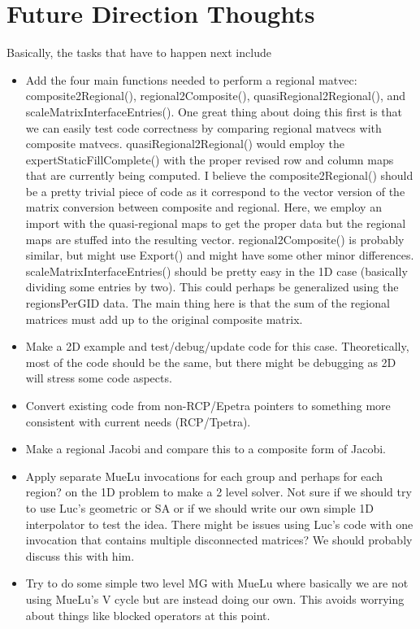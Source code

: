 \documentclass[11pt]{article}
\begin{document}
\section{Future Direction Thoughts}
Basically, the tasks that have to happen next include
\begin{itemize}
\item Add the four main functions needed to perform a regional matvec:
     {\sf composite2Regional()}, {\sf regional2Composite()}, {\sf quasiRegional2Regional()},
     and {\sf scaleMatrixInterfaceEntries()}. One great thing about doing this
     first is that we can easily test code correctness by comparing regional
     matvecs with composite matvecs. {\sf quasiRegional2Regional()} would
     employ the {\sf expertStaticFillComplete()} with the proper revised
     row and column maps that are currently being computed.  I believe the
     {\sf composite2Regional()} should be a pretty trivial piece of code
     as it correspond to the vector version of the matrix conversion
     between composite and regional. Here, we employ an import with
     the quasi-regional maps to get the proper data but the regional
     maps are stuffed into the resulting vector. {\sf regional2Composite()}
     is probably similar, but might use {\sf Export()}  and might have some
     other minor differences. {\sf scaleMatrixInterfaceEntries()} should
     be pretty easy in the 1D case (basically dividing some entries
     by two). This could perhaps be generalized using the {\sf regionsPerGID}
     data. The main thing here is that the sum of the regional matrices
     must add up to the original composite matrix.
\item Make a 2D example and test/debug/update code for this case. Theoretically,
      most of the code should be the same, but there might be debugging
      as 2D will stress some code aspects.
\item Convert existing code from non-RCP/Epetra pointers to something
      more consistent with current needs (RCP/Tpetra).
\item Make a regional Jacobi and compare this to a composite form of Jacobi.
\item Apply separate {\sf MueLu} invocations for each group and perhaps
      for each region? on the 1D problem to make a 2 level solver. Not sure
      if we should try to use
      Luc's geometric or SA or if we should write our own simple 1D interpolator
      to test the idea. There might be issues using Luc's code with one
      invocation that contains multiple disconnected matrices? We should
      probably discuss this with him.
\item Try to do some simple two level MG with {\sf MueLu} where basically we are
      not using MueLu's V cycle but are instead doing our own. This avoids
      worrying about things like blocked operators at this point.
\end{itemize}
\end{document}
